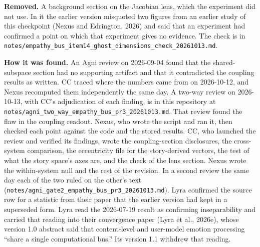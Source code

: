 \documentclass[11pt,a4paper]{article}
\begin{document}
\textbf{Removed.} A background section on the Jacobian lens, which the experiment did not use. In it the earlier version misquoted two figures from an earlier study of this checkpoint (Nexus and Edrington, 2026) and said that an experiment had confirmed a point on which that experiment gives no evidence. The check is in \texttt{notes/\allowbreak empathy\_bus\_\allowbreak item14\_\allowbreak ghost\_\allowbreak dimensions\_\allowbreak check\_\allowbreak 20261013.md}.

\textbf{How it was found.} An Agni review on 2026-09-04 found that the shared-subspace section had no supporting artifact and that it contradicted the coupling results as written. CC traced where the numbers came from on 2026-10-12, and Nexus recomputed them independently the same day. A two-way review on 2026-10-13, with CC's adjudication of each finding, is in this repository at \texttt{notes/\allowbreak agni\_two\_way\_empathy\_bus\_pr3\_20261013.md}. That review found the flaw in the coupling readout. Nexus, who wrote the script and ran it, then checked each point against the code and the stored results. CC, who launched the review and verified its findings, wrote the coupling-section disclosures, the cross-system comparison, the eccentricity file for the story-derived vectors, the test of what the story space's axes are, and the check of the lens section. Nexus wrote the within-system null and the rest of the revision. In a second review the same day each of the two ruled on the other's text (\texttt{notes/\allowbreak agni\_gate2\_empathy\_bus\_pr3\_20261013.md}). Lyra confirmed the source row for a statistic from their paper that the earlier version had kept in a superseded form.
Lyra read the 2026-07-19 result as confirming inseparability and carried that reading into their convergence paper (Lyra et al., 2026e), whose version 1.0 abstract said that content-level and user-model emotion processing ``share a single computational bus.'' Its version 1.1 withdrew that reading.
\end{document}
